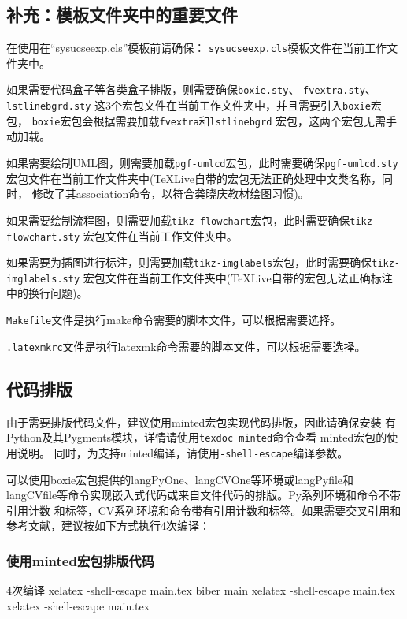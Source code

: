 \documentclass{sysucseexp}
\begin{document}
\subsection{补充：模板文件夹中的重要文件}
\begin{importantBox}
  在使用在\enquote{sysucseexp.cls}模板前请确保：
  \verb|sysucseexp.cls|模板文件在当前工作文件夹中。
  
  如果需要代码盒子等各类盒子排版，则需要确保\verb|boxie.sty|、
  \verb|fvextra.sty|、\verb|lstlinebgrd.sty|
  这3个宏包文件在当前工作文件夹中，并且需要引入\verb|boxie|宏包，
  \verb|boxie|宏包会根据需要加载\verb|fvextra|和\verb|lstlinebgrd|
  宏包，这两个宏包无需手动加载。
  
  如果需要绘制UML图，则需要加载\verb|pgf-umlcd|宏包，此时需要确保\verb|pgf-umlcd.sty|
  宏包文件在当前工作文件夹中(TeXLive自带的宏包无法正确处理中文类名称，同时，
  修改了其association命令，以符合龚晓庆教材绘图习惯)。
  
  如果需要绘制流程图，则需要加载\verb|tikz-flowchart|宏包，此时需要确保\verb|tikz-flowchart.sty|
  宏包文件在当前工作文件夹中。
  
  如果需要为插图进行标注，则需要加载\verb|tikz-imglabels|宏包，此时需要确保\verb|tikz-imglabels.sty|
  宏包文件在当前工作文件夹中(TeXLive自带的宏包无法正确标注中的换行问题)。

  \verb|Makefile|文件是执行make命令需要的脚本文件，可以根据需要选择。

  \verb|.latexmkrc|文件是执行latexmk命令需要的脚本文件，可以根据需要选择。
\end{importantBox}

\subsection{代码排版}
\begin{importantBox}
  由于需要排版代码文件，建议使用minted宏包实现代码排版，因此请确保安装
  有Python及其Pygments模块，详情请使用\verb|texdoc minted|命令查看
  minted宏包的使用说明。
  同时，为支持minted编译，请使用\verb|-shell-escape|编译参数。  
\end{importantBox}
可以使用boxie宏包提供的langPyOne、langCVOne等环境或langPyfile和langCVfile等命令实现嵌入式代码或来自文件代码的排版。Py系列环境和命令不带引用计数
和标签，CV系列环境和命令带有引用计数和标签。如果需要交叉引用和参考文献，建议按如下方式执行4次编译：
\subsubsection{使用minted宏包排版代码}
\begin{ubtdark}{4次编译}
  xelatex -shell-escape main.tex
  biber main
  xelatex -shell-escape main.tex
  xelatex -shell-escape main.tex
\end{ubtdark}
\end{document}
